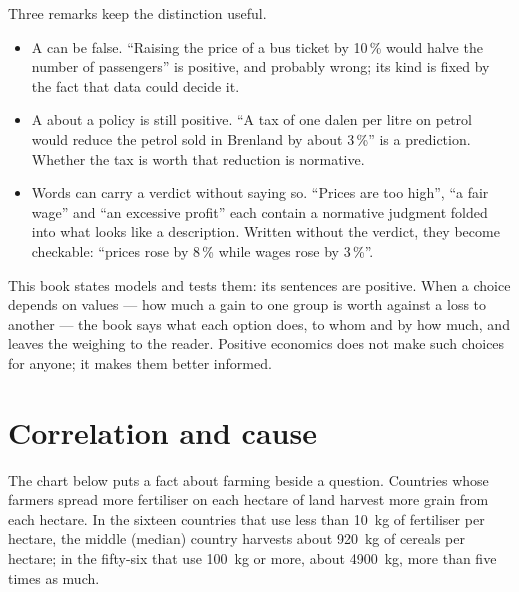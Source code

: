 Three remarks keep the distinction useful.
\begin{itemize}
\item A  can be false. ``Raising the price of a bus ticket by 10\,\% would halve
  the number of passengers'' is positive, and probably wrong; its kind is fixed by the fact that
  data could decide it.
\item A  about a policy is still positive. ``A tax of one dalen per litre on
  petrol would reduce the petrol sold in Brenland by about 3\,\%'' is a prediction. Whether the tax
  is worth that reduction is normative.
\item Words can carry a verdict without saying so. ``Prices are too high'', ``a fair wage'' and
  ``an excessive profit'' each contain a normative judgment folded into what looks like a
  description. Written without the verdict, they become checkable: ``prices rose by 8\,\% while
  wages rose by 3\,\%''.
\end{itemize}

\begin{remark}\label{rem:g10:economic-models:values}
This book states models and tests them: its sentences are positive. When a choice depends on
values --- how much a gain to one group is worth against a loss to another --- the book says what
each option does, to whom and by how much, and leaves the weighing to the reader. Positive
economics does not make such choices for anyone; it makes them better informed.
\end{remark}

\section{Correlation and cause}\label{sec:g10:economic-models:cause}

The chart below puts a fact about farming beside a question. Countries whose farmers spread more
fertiliser on each hectare of land harvest more grain from each hectare. In the sixteen countries
that use less than \qty{10}{kg} of fertiliser per hectare, the middle (median) country harvests
about \qty{920}{kg} of cereals per hectare; in the fifty-six that use \qty{100}{kg} or more, about
\qty{4900}{kg}, more than five times as much.

